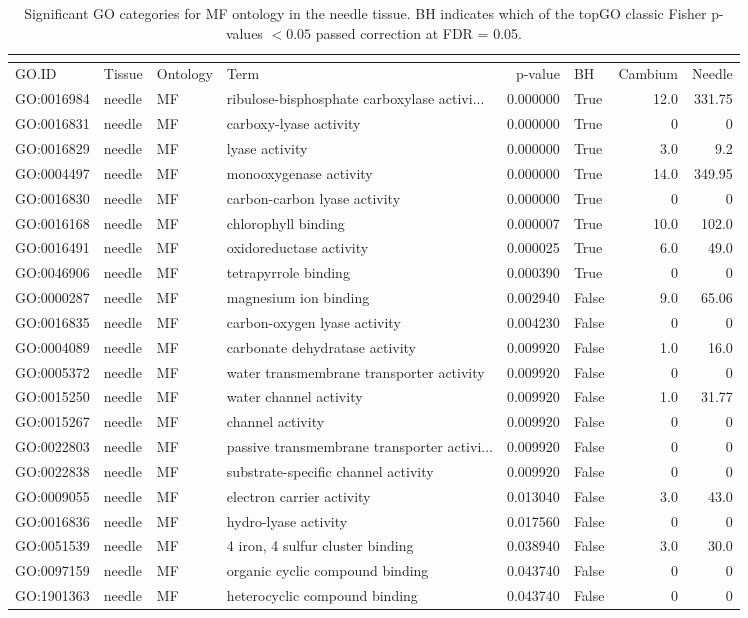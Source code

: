 \begin{longtable}{llllrlrr}
\caption{Significant GO categories for MF ontology in the needle tissue. BH indicates which of the topGO classic Fisher p-values $< 0.05$ passed correction at FDR = 0.05.}\\
\label{tab:go-needle-MF}\\
\toprule
GO.ID & Tissue & Ontology & Term & p-value & BH & Cambium & Needle \\
\midrule
GO:0016984 & needle & MF &   ribulose-bisphosphate carboxylase activi...  & 0.000000 &   True  & 12.0 & 331.75 \\ 
GO:0016831 & needle & MF &   carboxy-lyase activity  & 0.000000 &   True  & 0 & 0 \\
GO:0016829 & needle & MF &   lyase activity  & 0.000000 &   True  & 3.0 & 9.2 \\ 
GO:0004497 & needle & MF &   monooxygenase activity  & 0.000000 &   True  & 14.0 & 349.95 \\ 
GO:0016830 & needle & MF &   carbon-carbon lyase activity  & 0.000000 &   True  & 0 & 0 \\
GO:0016168 & needle & MF &   chlorophyll binding  & 0.000007 &   True  & 10.0 & 102.0 \\ 
GO:0016491 & needle & MF &   oxidoreductase activity  & 0.000025 &   True  & 6.0 & 49.0 \\ 
GO:0046906 & needle & MF &   tetrapyrrole binding  & 0.000390 &   True  & 0 & 0 \\
GO:0000287 & needle & MF &   magnesium ion binding  & 0.002940 &   False  & 9.0 & 65.06 \\ 
GO:0016835 & needle & MF &   carbon-oxygen lyase activity  & 0.004230 &   False  & 0 & 0 \\
GO:0004089 & needle & MF &   carbonate dehydratase activity  & 0.009920 &   False  & 1.0 & 16.0 \\ 
GO:0005372 & needle & MF &   water transmembrane transporter activity  & 0.009920 &   False  & 0 & 0 \\
GO:0015250 & needle & MF &   water channel activity  & 0.009920 &   False  & 1.0 & 31.77 \\ 
GO:0015267 & needle & MF &   channel activity  & 0.009920 &   False  & 0 & 0 \\
GO:0022803 & needle & MF &   passive transmembrane transporter activi...  & 0.009920 &   False  & 0 & 0 \\
GO:0022838 & needle & MF &   substrate-specific channel activity  & 0.009920 &   False  & 0 & 0 \\
GO:0009055 & needle & MF &   electron carrier activity  & 0.013040 &   False  & 3.0 & 43.0 \\ 
GO:0016836 & needle & MF &   hydro-lyase activity  & 0.017560 &   False  & 0 & 0 \\
GO:0051539 & needle & MF &   4 iron, 4 sulfur cluster binding  & 0.038940 &   False  & 3.0 & 30.0 \\ 
GO:0097159 & needle & MF &   organic cyclic compound binding  & 0.043740 &   False  & 0 & 0 \\
GO:1901363 & needle & MF &   heterocyclic compound binding  & 0.043740 &   False  & 0 & 0 \\
\bottomrule
\end{longtable}
